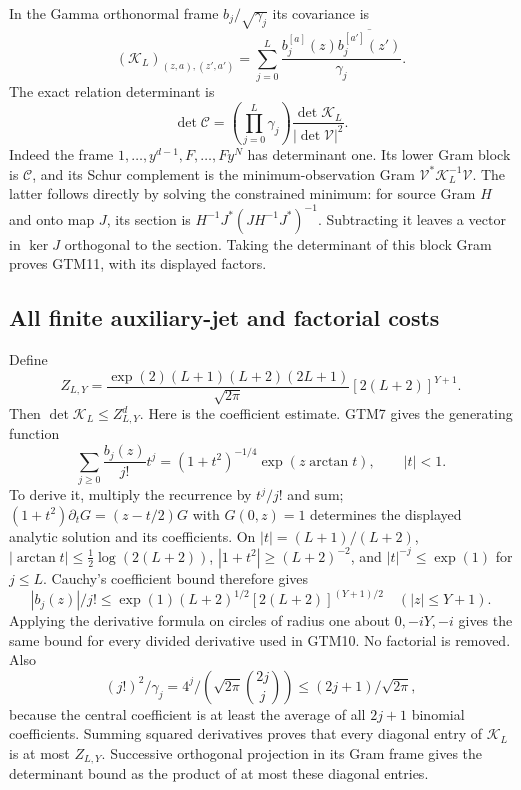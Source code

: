 \documentclass[11pt,a4paper]{article}
\begin{document}
In the Gamma orthonormal frame $b_j/\sqrt{\gamma_j}$ its covariance is
\begin{equation}\tag{GTM10}
 (\mathcal K_L)_{(z,a),(z',a')}
  =\sum_{j=0}^L\frac{b_j^{[a]}(z)
                    \overline{b_j^{[a']}(z')}}{\gamma_j}.
\end{equation}
The exact relation determinant is
\begin{equation}\tag{GTM11}
 \det\mathcal C=
  \left(\prod_{j=0}^L\gamma_j\right)
          \frac{\det\mathcal K_L}{|\det\mathcal V|^2}.
\end{equation}
Indeed the frame $1,\ldots,y^{d-1},F,\ldots,Fy^N$ has determinant
one.  Its lower Gram block is $\mathcal C$, and its Schur complement
is the minimum-observation Gram
$\mathcal V^*\mathcal K_L^{-1}\mathcal V$.
The latter follows directly by solving the constrained minimum:
for source Gram $H$ and onto map $J$, its section is
$H^{-1}J^*(JH^{-1}J^*)^{-1}$.  Subtracting it leaves a vector in
$\ker J$ orthogonal to the section.  Taking the determinant of this
block Gram proves GTM11, with its displayed factors.

\subsection{All finite auxiliary-jet and factorial costs}

Define
\begin{equation}\tag{GTM12}
 Z_{L,Y}=\frac{\exp(2)(L+1)(L+2)(2L+1)}{\sqrt{2\pi}}
                 [2(L+2)]^{Y+1}.
\end{equation}
Then $\det\mathcal K_L\le Z_{L,Y}^{d}$.
Here is the coefficient estimate.  GTM7 gives the generating function
\[
 \sum_{j\ge0}\frac{b_j(z)}{j!}t^j
 =(1+t^2)^{-1/4}\exp(z\arctan t),\qquad |t|<1.
\]
To derive it, multiply the recurrence by $t^j/j!$ and sum;
$(1+t^2)\partial_t G=(z-t/2)G$ with $G(0,z)=1$ determines the
displayed analytic solution and its coefficients.
On $|t|=(L+1)/(L+2)$,
$|\arctan t|\le\tfrac12\log(2(L+2))$,
$|1+t^2|\ge(L+2)^{-2}$, and $|t|^{-j}\le\exp(1)$ for $j\le L$.
Cauchy's coefficient bound therefore gives
\[
 |b_j(z)|/j!\le\exp(1)(L+2)^{1/2}[2(L+2)]^{(Y+1)/2}
                       \quad(|z|\le Y+1).
\]
Applying the derivative formula on circles of radius one about
$0,-iY,-i$ gives the same bound for every divided derivative used
in GTM10.  No factorial is removed.  Also
\[
 (j!)^2/\gamma_j
 =4^j/(\sqrt{2\pi}\binom{2j}{j})\le(2j+1)/\sqrt{2\pi},
\]
because the central coefficient is at least the average of all
$2j+1$ binomial coefficients.  Summing squared derivatives proves
that every diagonal entry of $\mathcal K_L$ is at most $Z_{L,Y}$.
Successive orthogonal projection in its Gram frame gives the
determinant bound as the product of at most these diagonal entries.
\end{document}
